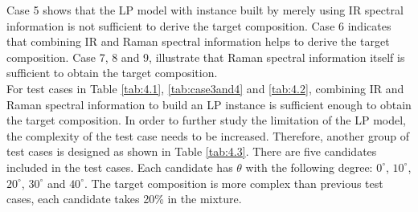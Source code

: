 \begin{table}[ht!] \tiny 
{}
\caption{Test case 5 to 9 for Met candidates.}
\label{tab:4.2}

\end{table}	

Case 5 shows that the LP model with instance built by merely using IR spectral information is not sufficient to derive the target composition. Case 6 indicates that combining IR and Raman spectral information helps to derive the target composition. Case 7, 8 and 9, illustrate that Raman spectral information itself is sufficient to obtain the target composition. \\

For test cases in Table \ref{tab:4.1}, \ref{tab:case3and4} and \ref{tab:4.2}, combining IR and Raman spectral information to build an LP instance is sufficient enough to obtain the target composition. In order to further study the limitation of the LP model, the complexity of the test case needs to be increased. Therefore, another group of test cases is designed as shown in Table \ref{tab:4.3}. There are five candidates included in the test cases. Each candidate has $\theta$ with the following degree: $0^{\circ}$, $10^{\circ}$, $20^{\circ}$, $30^{\circ}$ and $40^{\circ}$. The target composition is more complex than previous test cases, each candidate takes 20\% in the mixture. \\

